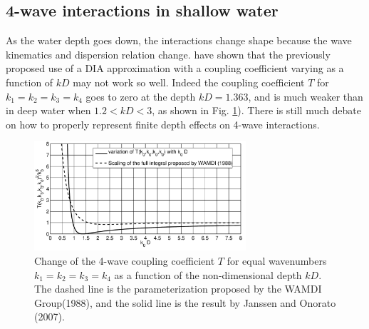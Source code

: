 \subsection{4-wave interactions in shallow water}
As the water depth goes down, the interactions change shape because the wave kinematics and dispersion relation change. \citep{Janssen&Onorato2007} have shown that the previously proposed use of a DIA approximation with a coupling coefficient varying as a function of $kD$  may not work so well. 
Indeed the coupling coefficient $T$ for $k_1=k_2=k_3=k_4$ goes to zero at the depth $kD=1.363$, and is much weaker than in deep water when $1.2 < kD < 3$, as shown in Fig. 
\ref{T2_Snl_vs_KD}). There is still much debate on how to properly represent finite depth effects on 4-wave interactions. 
\begin{figure}
\centerline{\includegraphics[width=0.70\textwidth]{FIGS_CH_NONLIN/Tsquared_kD.pdf}}
\caption{Change of the 4-wave coupling coefficient $T$ for equal wavenumbers  $k_1=k_2=k_3=k_4$ as a function of the non-dimensional depth $kD$. The dashed line is the parameterization proposed by the WAMDI Group(1988), and the solid line is the result by Janssen and Onorato (2007).} \label{T2_Snl_vs_KD}
\end{figure}
